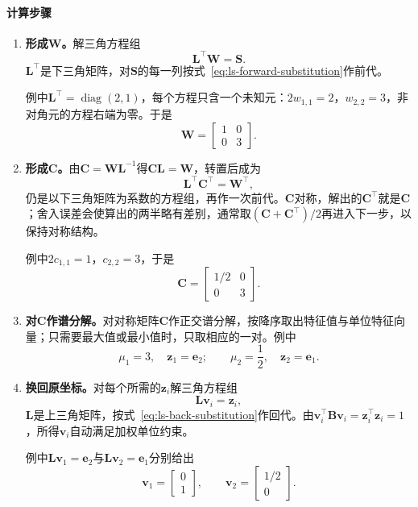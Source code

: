 \paragraph{计算步骤}
\begin{enumerate}
 \item \textbf{形成$\bm W$。}解三角方程组
 \begin{equation}
  \bm L^\top\bm W=\bm S .
  \label{eq:ls-generalized-solve-w}
 \end{equation}
 $\bm L^\top$是下三角矩阵，对$\bm S$的每一列按式~\eqref{eq:ls-forward-substitution}作前代。

 例中$\bm L^\top=\operatorname{diag}(2,1)$，每个方程只含一个未知元：$2w_{1,1}=2$，$w_{2,2}=3$，非对角元的方程右端为零。于是
 \[
  \bm W=\begin{bmatrix}1&0\\0&3\end{bmatrix}.
 \]

 \item \textbf{形成$\bm C$。}由$\bm C=\bm W\bm L^{-1}$得$\bm C\bm L=\bm W$，转置后成为
 \begin{equation}
  \bm L^\top\bm C^\top=\bm W^\top ,
  \label{eq:ls-generalized-solve-c}
 \end{equation}
 仍是以下三角矩阵为系数的方程组，再作一次前代。$\bm C$对称，解出的$\bm C^\top$就是$\bm C$；舍入误差会使算出的两半略有差别，通常取$(\bm C+\bm C^\top)/2$再进入下一步，以保持对称结构。

 例中$2c_{1,1}=1$，$c_{2,2}=3$，于是
 \[
  \bm C=\begin{bmatrix}1/2&0\\0&3\end{bmatrix}.
 \]

 \item \textbf{对$\bm C$作谱分解。}对对称矩阵$\bm C$作正交谱分解，按降序取出特征值与单位特征向量；只需要最大值或最小值时，只取相应的一对。例中
 \[
  \mu_1=3,\quad \bm z_1=\bm e_2;\qquad \mu_2=\frac12,\quad \bm z_2=\bm e_1 .
 \]

 \item \textbf{换回原坐标。}对每个所需的$\bm z_i$解三角方程组
 \begin{equation}
  \bm L\bm v_i=\bm z_i ,
  \label{eq:ls-generalized-recover-v}
 \end{equation}
 $\bm L$是上三角矩阵，按式~\eqref{eq:ls-back-substitution}作回代。由$\bm v_i^\top\bm B\bm v_i=\bm z_i^\top\bm z_i=1$，所得$\bm v_i$自动满足加权单位约束。

 例中$\bm L\bm v_1=\bm e_2$与$\bm L\bm v_2=\bm e_1$分别给出
 \[
  \bm v_1=\begin{bmatrix}0\\1\end{bmatrix},\qquad \bm v_2=\begin{bmatrix}1/2\\0\end{bmatrix}.
 \]


\end{enumerate}
